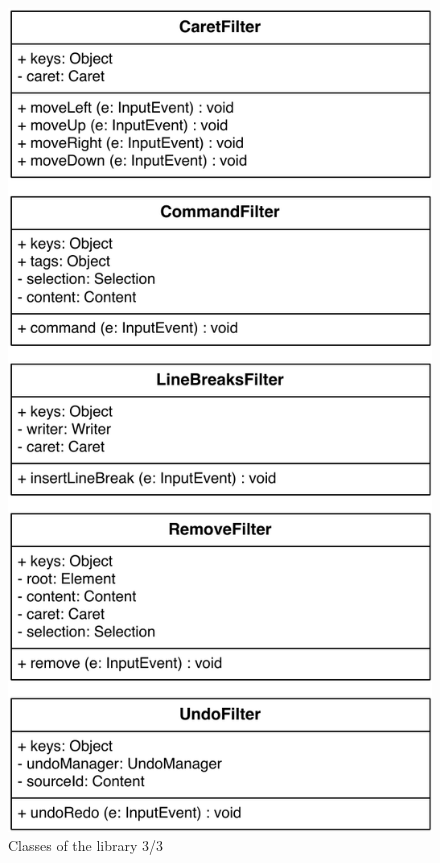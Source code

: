 \begin{landscape}
  \begin{figure}[htb]
    \centerline{\includegraphics[width=\textwidth,height=\textheight,keepaspectratio]{images/ClassesType-3}}
    \caption{Classes of the library 3/3}
    \label{fig:classes_type_three}
  \end{figure}
\end{landscape}

